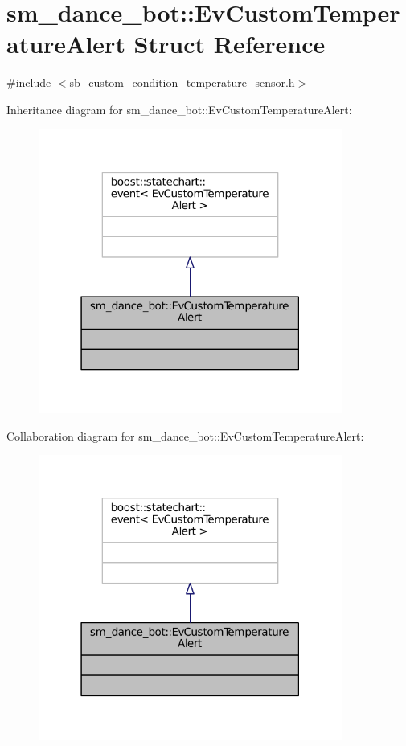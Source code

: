 \hypertarget{structsm__dance__bot_1_1EvCustomTemperatureAlert}{}\section{sm\+\_\+dance\+\_\+bot\+:\+:Ev\+Custom\+Temperature\+Alert Struct Reference}
\label{structsm__dance__bot_1_1EvCustomTemperatureAlert}


{\ttfamily \#include $<$sb\+\_\+custom\+\_\+condition\+\_\+temperature\+\_\+sensor.\+h$>$}



Inheritance diagram for sm\+\_\+dance\+\_\+bot\+:\+:Ev\+Custom\+Temperature\+Alert\+:
\nopagebreak
\begin{figure}[H]
\begin{center}
\leavevmode
\includegraphics[width=283pt]{structsm__dance__bot_1_1EvCustomTemperatureAlert__inherit__graph}
\end{center}
\end{figure}


Collaboration diagram for sm\+\_\+dance\+\_\+bot\+:\+:Ev\+Custom\+Temperature\+Alert\+:
\nopagebreak
\begin{figure}[H]
\begin{center}
\leavevmode
\includegraphics[width=283pt]{structsm__dance__bot_1_1EvCustomTemperatureAlert__coll__graph}
\end{center}
\end{figure}


